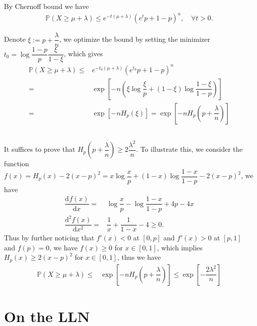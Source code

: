 \documentclass[11pt,a4paper]{article}
\numberwithin{equation}{section}%
\begin{document}
By Chernoff bound we have
\begin{align*}
    \mathbb{P}\left( X\geq \mu +\lambda  \right) \leq e^{-t(\mu +\lambda)}\left( e^tp+1-p \right)^n,\quad \forall t>0.
\end{align*}

Denote $ \xi := p+\dfrac{ \lambda  }{ n }  $, we optimize the bound by setting the minimizer $ t_0=\log \dfrac{ 1-p }{ p }\dfrac{ \xi  }{ 1-\xi  }   $, which gives
\begin{align*}
    \mathbb{P}\left( X\geq \mu +\lambda  \right) \leq& e^{-t_0(\mu +\lambda)}\left( e^{t_0}p+1-p \right)^n\\
    =&\exp\left[ -n (\xi \log\dfrac{ \xi  }{ p } + (1-\xi )\log\dfrac{ 1-\xi  }{ 1-p }  ) \right]\\
    =&\exp\left[ -n H_p(\xi ) \right]  =\exp\left[ -n H_p(p+\dfrac{ \lambda  }{ n }  ) \right]
\end{align*}



\subsection{}
It suffices to prove that $ H_p(p+\dfrac{ \lambda  }{ n } ) \geq 2\dfrac{ \lambda ^2 }{ n }  $. To illustrate this, we consider the function $ f(x)=H_p(x) - 2(x-p)^2  = x\log\dfrac{ x }{ p } +(1-x)\log\dfrac{ 1-x }{ 1-p } -2(x-p)^2  $, we have
\begin{align*}
    \dfrac{\mathrm{d}^{} f(x) }{\mathrm{d} x^{} }=& \log\dfrac{ x }{ p } -\log\dfrac{ 1-x }{ 1-p }  + 4p-4x\\
    \dfrac{\mathrm{d}^{2} f(x) }{\mathrm{d} x^{2} }=& \dfrac{ 1 }{ x } +\dfrac{ 1 }{ 1-x } -4 \geq 0. 
\end{align*}
Thus by further noticing that $ f'(x)<0 $ at $ [0,p] $ and $ f'(x)>0 $ at $ [p,1] $ and $ f(p)=0 $, we have $ f(x)\geq 0 $ for $ x\in [0,1] $, which implies $ H_p(x)\geq 2(x-p)^2 $ for $ x\in [0,1] $, thus we have
\begin{align*}
    \mathbb{P}\left( X\geq \mu +\lambda  \right) \leq&\exp\left[ -n H_p(p+\dfrac{ \lambda  }{ n }  ) \right] \leq \exp\left[ -\dfrac{ 2\lambda ^2 }{ n }  \right]
\end{align*}






\section{On the LLN}
\end{document}
